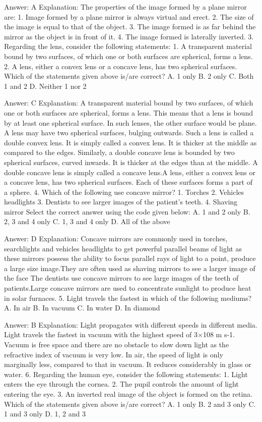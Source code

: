 Answer: A
Explanation: The properties of the image formed by a plane mirror are: 1. Image formed by a plane mirror is always virtual and erect. 2. The size of the image is equal to that of the object. 3. The image formed is as far behind the mirror as the object is in front of it. 4. The image formed is laterally inverted. 3. Regarding the lens, consider the following statements: 1. A transparent material bound by two surfaces, of which one or both surfaces are spherical, forms a lens. 2. A lens, either a convex lens or a concave lens, has two spherical surfaces. Which of the statements given above is/are correct? A. 1 only B. 2 only C. Both 1 and 2 D. Neither 1 nor 2 

Answer: C
Explanation: A transparent material bound by two surfaces, of which one or both surfaces are spherical, forms a lens. This means that a lens is bound by at least one spherical surface. In such lenses, the other surface would be plane. A lens may have two spherical surfaces, bulging outwards. Such a lens is called a double convex lens. It is simply called a convex lens. It is thicker at the middle as compared to the edges. Similarly, a double concave lens is bounded by two spherical surfaces, curved inwards. It is thicker at the edges than at the middle. A double concave lens is simply called a concave lens.A lens, either a convex lens or a concave lens, has two spherical surfaces. Each of these surfaces forms a part of a sphere. 4. Which of the following use concave mirror? 1. Torches 2. Vehicles headlights 3. Dentists to see larger images of the patient's teeth. 4. Shaving mirror Select the correct answer using the code given below: A. 1 and 2 only B. 2, 3 and 4 only C. 1, 3 and 4 only D. All of the above 

Answer: D
Explanation: Concave mirrors are commonly used in torches, searchlights and vehicles headlights to get powerful parallel beams of light as these mirrors possess the ability to focus parallel rays of light to a point, produce a large size image.They are often used as shaving mirrors to see a larger image of the face The dentists use concave mirrors to see large images of the teeth of patients.Large concave mirrors are used to concentrate sunlight to produce heat in solar furnaces. 5. Light travels the fastest in which of the following mediums? A. In air B. In vacuum C. In water D. In diamond 

Answer: B
Explanation: Light propagates with different speeds in different media. Light travels the fastest in vacuum with the highest speed of 3×108 m s-1. Vacuum is free space and there are no obstacle to slow down light as the refractive index of vacuum is very low. In air, the speed of light is only marginally less, compared to that in vacuum. It reduces considerably in glass or water. 6. Regarding the human eye, consider the following statements: 1. Light enters the eye through the cornea. 2. The pupil controls the amount of light entering the eye. 3. An inverted real image of the object is formed on the retina. Which of the statements given above is/are correct? A. 1 only B. 2 and 3 only C. 1 and 3 only D. 1, 2 and 3 

